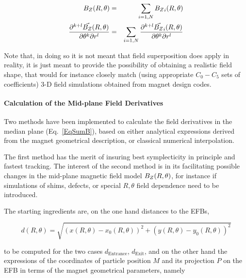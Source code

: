 {\begin{eqnarray}
\label{EqSumB}
{B_Z}(R,\theta) &=&  \sum_{i=1,N} {B_Z}_i(R,\theta)   \\
\dfrac{\partial^{ k+l}\vec {{B_Z}}(R,\theta) }{ \partial \theta^k\partial r^l} &=&  \sum_{i=1,N} 
\dfrac{\partial^{ k+l}\vec {{B_Z}}_i(R,\theta) }{ \partial \theta^k\partial r^l} 
\end{eqnarray}

\noindent  Note that, in doing so it is not meant that field superposition  does apply 
in reality, it is just meant to provide the possibility 
of obtaining a realistic  field shape, that would for instance closely match (using appropriate $C_0-C_5$ sets 
of coefficients) 3-D  field simulations obtained from magnet design codes. 


\bigskip




\paragraph{Calculation of the  Mid-plane Field Derivatives}

\noindent Two  methods have been implemented to calculate the field derivatives in the median 
plane (Eq.~\ref{EqSumB}), based on 
 either analytical expressions derived from the magnet geometrical description,  or  classical numerical interpolation. 
 
\noindent The first method has the merit of insuring best symplecticity in principle and fastest tracking. 
The interest of the second method is in its  facilitating possible  changes in 
  the mid-plane magnetic field model ${B_Z}(R,\theta)$, for instance if simulations of shims, defects, 
or special $R, \theta$  field dependence need to be introduced. 



\bigskip

\label{AnalMeth}

\bigskip

\noindent The  starting ingredients are, on the one hand distances to the EFBs,  

$$d(R,\theta)=\sqrt{(x(R,\theta)-x_{0}(R,\theta))^2+(y(R,\theta)-y_{0}(R,\theta))^2}$$

\noindent to be computed for the two cases $d_{\textrm{Entrance}}$, $d_{\textrm{Exit}}$, and 
on the other hand the expressions of the coordinates of particle position $M$ and its projection $P$ on 
the EFB in terms of the magnet geometrical parameters, namely 

}
